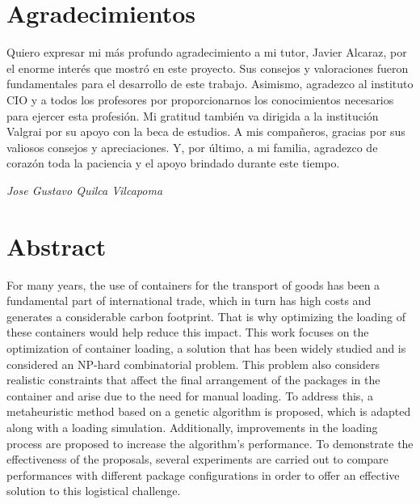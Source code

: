 \documentclass[openany]{article}
\begin{document}
\newpage
\thispagestyle{plain}
\section*{Agradecimientos}

\lipsum[0]
Quiero expresar mi más profundo agradecimiento a mi tutor, Javier Alcaraz, por el enorme interés que mostró en este proyecto. Sus consejos y valoraciones fueron fundamentales para el desarrollo de este trabajo. Asimismo, agradezco al instituto CIO y a todos los profesores por proporcionarnos los conocimientos necesarios para ejercer esta profesión. Mi gratitud también va dirigida a la institución Valgrai por su apoyo con la beca de estudios. A mis compañeros, gracias por sus valiosos consejos y apreciaciones. Y, por último, a mi familia, agradezco de corazón toda la paciencia y el apoyo brindado durante este tiempo.

\mbox{}\par
\vspace{0.5cm}

\begin{flushright}
    \textit{Jose Gustavo Quilca Vilcapoma}
\end{flushright}



\newpage
\thispagestyle{plain}

\section*{Abstract}

For many years, the use of containers for the transport of goods has been a fundamental part of international trade, which in turn has high costs and generates a considerable carbon footprint. That is why optimizing the loading of these containers would help reduce this impact. This work focuses on the optimization of container loading, a solution that has been widely studied and is considered an NP-hard combinatorial problem. This problem also considers realistic constraints that affect the final arrangement of the packages in the container and arise due to the need for manual loading. To address this, a metaheuristic method based on a genetic algorithm is proposed, which is adapted along with a loading simulation. Additionally, improvements in the loading process are proposed to increase the algorithm's performance. To demonstrate the effectiveness of the proposals, several experiments are carried out to compare performances with different package configurations in order to offer an effective solution to this logistical challenge.
\end{document}
